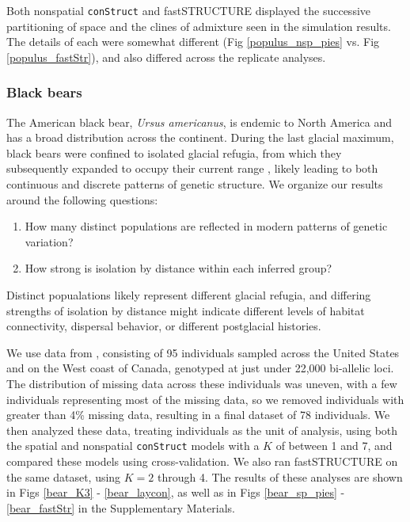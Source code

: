 \documentclass[10pt,letterpaper]{article}
\begin{document}
Both nonspatial \texttt{conStruct} and fastSTRUCTURE displayed 
the successive partitioning of space and the clines of admixture seen in the simulation results.
The details of each were somewhat different 
(Fig \ref{populus_nsp_pies} vs. Fig \ref{populus_fastStr}), 
and also differed across the replicate analyses.

\subsubsection*{Black bears}

The American black bear, \textit{Ursus americanus}, is endemic to North America
and has a broad distribution across the continent.
During the last glacial maximum, 
black bears were confined to isolated glacial refugia, 
from which they subsequently expanded to occupy their current range
\cite{WoodingWard1997,Byun1997,Stone2000,Puckett2015},
likely leading to both continuous and discrete patterns of genetic structure.
We organize our results around the following questions:
\begin{enumerate}
    \item How many distinct populations
        are reflected in modern patterns of genetic variation?
    \item How strong is isolation by distance within each inferred group?
\end{enumerate}
Distinct popualations likely represent different glacial refugia,
and differing strengths of isolation by distance might indicate 
different levels of habitat connectivity,
dispersal behavior,
or different postglacial histories.

We use data from \cite{Puckett2015}, consisting of 95 individuals 
sampled across the United States and on the West coast of Canada,
genotyped at just under 22,000 bi-allelic loci.
The distribution of missing data across these individuals was uneven, 
with a few individuals representing most of the missing data, 
so we removed individuals with greater than 4\% missing data, 
resulting in a final dataset of 78 individuals.
We then analyzed these data, treating individuals as the unit of analysis, 
using both the spatial and nonspatial \texttt{conStruct} models with a $K$ of between 1 and 7, 
and compared these models using cross-validation.
We also ran fastSTRUCTURE \cite{fastStructure} on the same dataset, 
using $K = 2$ through 4.
The results of these analyses are shown in Figs \ref{bear_K3} - \ref{bear_laycon}, 
as well as in Figs \ref{bear_sp_pies} - \ref{bear_fastStr} in the Supplementary Materials.
\end{document}
